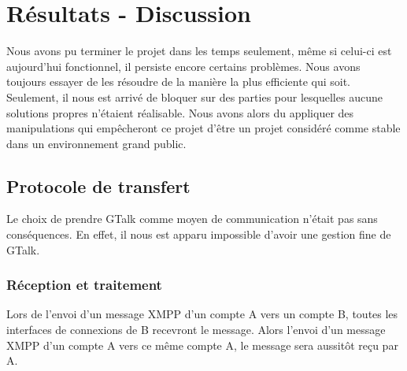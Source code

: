 \cleardoublepage



\chapter{Résultats - Discussion}

Nous avons pu terminer le projet dans les temps seulement, même si celui-ci est aujourd'hui fonctionnel, il persiste encore certains problèmes. Nous avons toujours essayer de les
résoudre de la manière la plus efficiente qui soit. Seulement, il nous est arrivé de bloquer sur des
parties pour lesquelles aucune solutions propres n'étaient réalisable. Nous avons alors du appliquer 
des manipulations qui empêcheront ce projet d'être un projet considéré comme stable dans un environnement
grand public.






\section{Protocole de transfert}

Le choix de prendre GTalk comme moyen de communication n'était pas sans conséquences.
En effet, il nous est apparu impossible d'avoir une gestion fine de GTalk.




\subsection{Réception et traitement}

Lors de l'envoi d'un message XMPP d'un compte A vers un compte B, toutes les interfaces de connexions de B recevront le message.
Alors l'envoi d'un message XMPP d'un compte A vers ce même compte A, le message sera aussitôt reçu par A.

